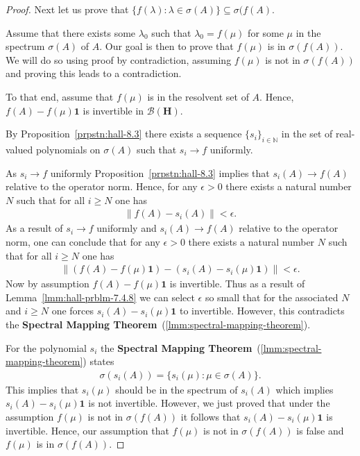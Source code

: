\begin{proof}
Next let us prove that $\{ f(\lambda) : \lambda \in \sigma(A) \} \subseteq \sigma(f(A)$.

Assume that there exists some $\lambda_0$ such that $\lambda_0 = f(\mu)$ for some $\mu$ in the spectrum $\sigma(A)$ of $A$. Our goal is then to prove that $f(\mu)$ is in $\sigma(f(A))$. We will do so using proof by contradiction, assuming $f(\mu)$ is not in $\sigma(f(A))$ and proving this leads to a contradiction.

To that end, assume that $f(\mu)$ is in the resolvent set of $A$. Hence, $f(A) - f(\mu) \mathbf{1}$ is invertible in $\mathcal{B}(\mathbf{H})$.

By Proposition~\ref{prpstn:hall-8.3} there exists a sequence $\{ s_i \}_{i \in \mathbb{N}}$ in the set of real-valued polynomials on $\sigma(A)$ such that $s_i \rightarrow f$ uniformly.

As $s_i \rightarrow f$ uniformly Proposition~\ref{prpstn:hall-8.3} implies that $s_i(A) \rightarrow f(A)$ relative to the operator norm. Hence, for any $\epsilon > 0$ there exists a natural number $N$ such that for all $i \ge N$ one has
\begin{align}
    \|f(A) - s_i(A)\| < \epsilon.
\end{align}
As a result of $s_i \rightarrow f$ uniformly and $s_i(A) \rightarrow f(A)$ relative to the operator norm, one can conclude that for any $\epsilon > 0$ there exists a natural number $N$ such that for all $i \ge N$ one has
\begin{align}
    \|(f(A) - f(\mu)\mathbf{1}) - (s_i(A) - s_i(\mu)\mathbf{1})\| < \epsilon.
\end{align}
Now by assumption $f(A) - f(\mu)\mathbf{1}$ is invertible. Thus as a result of Lemma~\ref{lmm:hall-prblm-7.4.8} we can select $\epsilon$ so small that for the associated $N$ and $i \ge N$ one forces $s_i(A) - s_i(\mu)\mathbf{1}$ to invertible. However, this contradicts the \textbf{Spectral Mapping Theorem}~(\ref{lmm:spectral-mapping-theorem}).

For the polynomial $s_i$ the \textbf{Spectral Mapping Theorem}~(\ref{lmm:spectral-mapping-theorem}) states
\begin{align}
    \sigma(s_i(A)) = \{ s_i(\mu) : \mu \in \sigma(A) \}.
\end{align}
This implies that $s_i(\mu)$ should be in the spectrum of $s_i(A)$ which implies $s_i(A) - s_i(\mu)\mathbf{1}$ is not invertible. However, we just proved that under the assumption $f(\mu)$ is not in $\sigma(f(A))$ it follows that $s_i(A) - s_i(\mu)\mathbf{1}$ is invertible. Hence, our assumption that $f(\mu)$ is not in $\sigma(f(A))$ is false and $f(\mu)$ is in $\sigma(f(A))$.


\end{proof}
